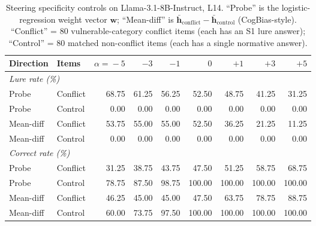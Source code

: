 \documentclass{article}
\begin{document}
\begin{table}[ht]
\centering
\caption{Steering specificity controls on Llama-3.1-8B-Instruct, L14.
  ``Probe'' is the logistic-regression weight vector $\mathbf{w}$;
  ``Mean-diff'' is $\bar{\mathbf{h}}_{\text{conflict}} - \bar{\mathbf{h}}_{\text{control}}$
  (CogBias-style).  ``Conflict'' = 80 vulnerable-category conflict items
  (each has an S1 lure answer); ``Control'' = 80 matched non-conflict
  items (each has a single normative answer).}
\label{tab:steering_specificity}
\vspace{4pt}
\small
\begin{tabular}{l l rrrrrrr}
\toprule
\textbf{Direction} & \textbf{Items} & $\alpha\!=\!-5$ & $-3$ & $-1$ & $0$ & $+1$ & $+3$ & $+5$ \\
\midrule
\multicolumn{9}{l}{\emph{Lure rate (\%)}} \\
Probe        & Conflict & 68.75 & 61.25 & 56.25 & 52.50 & 48.75 & 41.25 & 31.25 \\
Probe        & Control  & 0.00  & 0.00  & 0.00  & 0.00  & 0.00  & 0.00  & 0.00  \\
Mean-diff    & Conflict & 53.75 & 55.00 & 55.00 & 52.50 & 36.25 & 21.25 & 11.25 \\
Mean-diff    & Control  & 0.00  & 0.00  & 0.00  & 0.00  & 0.00  & 0.00  & 0.00  \\
\midrule
\multicolumn{9}{l}{\emph{Correct rate (\%)}} \\
Probe        & Conflict & 31.25 & 38.75 & 43.75 & 47.50 & 51.25 & 58.75 & 68.75 \\
Probe        & Control  & 78.75 & 87.50 & 98.75 & 100.00 & 100.00 & 100.00 & 100.00 \\
Mean-diff    & Conflict & 46.25 & 45.00 & 45.00 & 47.50 & 63.75 & 78.75 & 88.75 \\
Mean-diff    & Control  & 60.00 & 73.75 & 97.50 & 100.00 & 100.00 & 100.00 & 100.00 \\
\bottomrule
\end{tabular}
\end{table}
\end{document}
